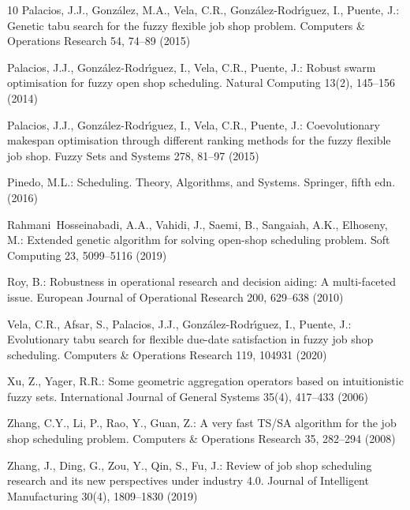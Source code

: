 \documentclass[12pt,halfline,a4paper]{ouparticle}
\begin{document}
\begin{thebibliography}{10}
Palacios, J.J., Gonz\'alez, M.A., Vela, C.R., Gonz\'alez-Rodr\'{\i}guez, I.,
  Puente, J.: Genetic tabu search for the fuzzy flexible job shop problem.
  Computers \& Operations Research  54,  74--89 (2015)

Palacios, J.J., Gonz\'alez-Rodr\'{\i}guez, I., Vela, C.R., Puente, J.: Robust
  swarm optimisation for fuzzy open shop scheduling. Natural Computing  13(2),
  145--156 (2014)

Palacios, J.J., Gonz\'alez-Rodr\'{\i}guez, I., Vela, C.R., Puente, J.:
  Coevolutionary makespan optimisation through different ranking methods for
  the fuzzy flexible job shop. Fuzzy Sets and Systems  278,  81--97 (2015)

Pinedo, M.L.: Scheduling. Theory, Algorithms, and Systems. Springer, fifth edn.
  (2016)

Rahmani~Hosseinabadi, A.A., Vahidi, J., Saemi, B., Sangaiah, A.K., Elhoseny,
  M.: Extended genetic algorithm for solving open-shop scheduling problem. Soft
  Computing  23,  5099--5116 (2019)

Roy, B.: Robustness in operational research and decision aiding: A
  multi-faceted issue. European Journal of Operational Research  200,  629--638
  (2010)

Vela, C.R., Afsar, S., Palacios, J.J., Gonz\'alez-Rodr\'{\i}guez, I., Puente,
  J.: Evolutionary tabu search for flexible due-date satisfaction in fuzzy job
  shop scheduling. Computers \& Operations Research  119,  104931 (2020)

Xu, Z., Yager, R.R.: Some geometric aggregation operators based on
  intuitionistic fuzzy sets. International Journal of General Systems  35(4),
  417--433 (2006)

Zhang, C.Y., Li, P., Rao, Y., Guan, Z.: A very fast {TS/SA} algorithm for the
  job shop scheduling problem. Computers \& Operations Research  35,  282--294
  (2008)

Zhang, J., Ding, G., Zou, Y., Qin, S., Fu, J.: Review of job shop scheduling
  research and its new perspectives under industry 4.0. Journal of Intelligent
  Manufacturing  30(4),  1809--1830 (2019)

\end{thebibliography}
\end{document}
